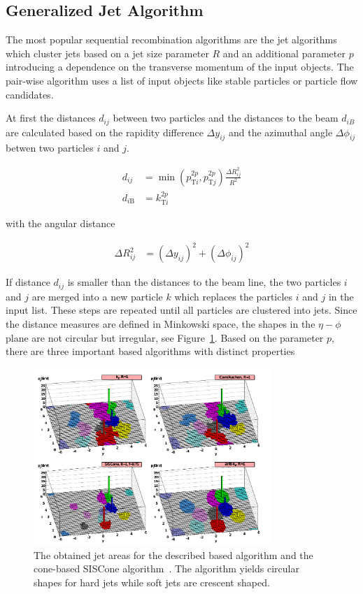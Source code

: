 \subsection{Generalized \kt Jet Algorithm}

The most popular sequential recombination algorithms are the \kt jet
algorithms which cluster jets based on a jet size parameter $R$ and an
additional parameter $p$ introducing a dependence on the transverse momentum of
the input objects. The pair-wise algorithm uses a list of input objects like stable
particles or particle flow candidates. 

At first the distances $d_{ij}$ between two particles and the distances to the
beam  $d_{iB}$ are calculated based on the rapidity difference $\Delta y_{ij}$
and the azimuthal angle $\Delta \phi_{ij}$ betwen two particles $i$ and $j$.

\begin{align} 
    d_{ij} &= \min(p_{\mathrm{T}i}^{2p},p_{\mathrm{T}j}^{2p})\frac{\Delta R_{ij}^2}{R^2}\\
    d_{i\mathrm{B}} &= k_{\mathrm{T}i}^{2p}
\end{align} 

with the angular distance

\begin{align}
    \Delta R_{ij}^2 &= (\Delta y_{ij})^2 + (\Delta \phi_{ij})^2
\end{align} 

If distance $d_{ij}$ is smaller than the distances to the beam line, the two
particles $i$ and $j$ are merged into a new particle $k$ which replaces the
particles $i$ and $j$ in the input list. These steps are repeated until all
particles are clustered into jets. Since the distance measures are defined in
Minkowski space, the shapes in the $\eta-\phi$ plane are not circular but
irregular, see Figure~\ref{fig:jet_shapes}. Based on the parameter $p$, there
are three important \kt based algorithms with distinct properties

\begin{figure}[htb]
    \centering
    \includegraphics[width=0.8\textwidth]{figures/jet_reconstruction/jet_shapes.pdf}
    \caption{The obtained jet areas for the described \kt based algorithm
        and the cone-based SISCone algorithm~\cite{Salam:2009jx}. The \antikt
        algorithm yields circular shapes for hard jets while soft jets are crescent
        shaped.}
    \label{fig:jet_shapes}
\end{figure}

